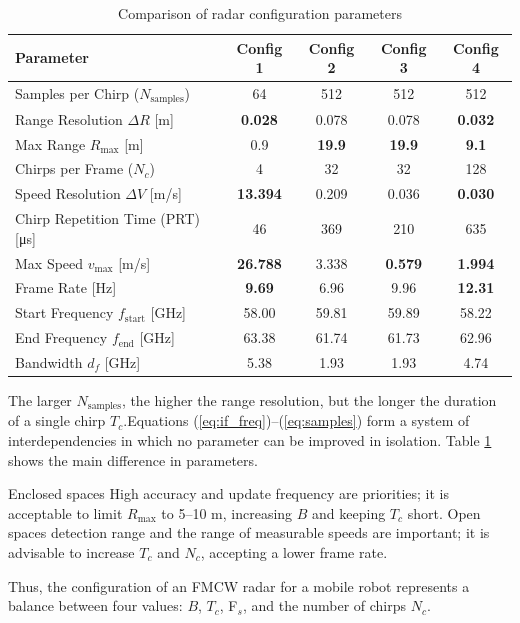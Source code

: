 \begin{table}[H]
\centering
\caption{Comparison of radar configuration parameters}
\label{tab:radar_params}
\begin{tabular}{|l|c|c|c|c|}
\hline
\textbf{Parameter} & \textbf{Config 1} & \textbf{Config 2} & \textbf{Config 3} & \textbf{Config 4} \\
\hline
Samples per Chirp ($N_\text{samples}$) & 64 & 512 & 512 & 512 \\
Range Resolution $\Delta R$ [m] & \textbf{0.028} & 0.078 & 0.078 & \textbf{0.032} \\
Max Range $R_\text{max}$ [m] & 0.9 & \textbf{19.9} & \textbf{19.9} & \textbf{9.1} \\
Chirps per Frame ($N_c$) & 4 & 32 & 32 & 128 \\
Speed Resolution $\Delta V$ [m/s] & \textbf{13.394} & 0.209 & 0.036 & \textbf{0.030} \\
Chirp Repetition Time (PRT) [μs] & 46 & 369 & 210 & 635 \\
Max Speed $v_\text{max}$ [m/s] & \textbf{26.788} & 3.338 & \textbf{0.579} & \textbf{1.994} \\
Frame Rate [Hz] & \textbf{9.69} & 6.96 & 9.96 & \textbf{12.31} \\
Start Frequency $f_\text{start}$ [GHz] & 58.00 & 59.81 & 59.89 & 58.22 \\
End Frequency $f_\text{end}$ [GHz] & 63.38 & 61.74 & 61.73 & 62.96 \\
Bandwidth $d_f$ [GHz] & 5.38 & 1.93 & 1.93 & 4.74 \\
\hline
\end{tabular}
\end{table}


The larger $N_{\text{samples}}$, the higher the range resolution, but the longer the duration of a single chirp $T_c$.Equations (\ref{eq:if_freq})--(\ref{eq:samples}) form a system of interdependencies in which no parameter can be improved in isolation. Table \ref{tab:radar_params} shows the main difference in parameters.

Enclosed spaces High accuracy and update frequency are priorities; it is acceptable to limit $R_{\max}$ to 5–10 m, increasing $B$ and keeping $T_c$ short. 
Open spaces detection range and the range of measurable speeds are important; it is advisable to increase $T_c$ and $N_c$, accepting a lower frame rate.

Thus, the configuration of an FMCW radar for a mobile robot represents a balance between four values: $B$, $T_c$, F$_s$, and the number of chirps $N_c$.



